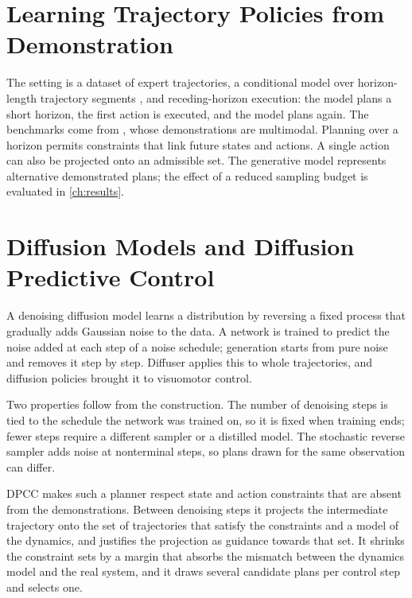 \documentclass[headsepline,footsepline,footinclude=false,oneside,fontsize=11pt,paper=a4,listof=totoc,bibliography=totoc]{scrbook}
\theoremstyle{definition}
\theoremstyle{plain}
\theoremstyle{remark}
\begin{document}
\section{Learning Trajectory Policies from Demonstration}\label{sec:bg:il}

The setting is a dataset of expert trajectories, a conditional model over horizon-length
trajectory segments \parencite{janner2022planning,chi2023diffusion}, and receding-horizon
execution: the model plans a short horizon, the first action is executed, and the model plans again.
The benchmarks come from \parencite{jia2024towards}, whose demonstrations are multimodal. Planning
over a horizon permits constraints that link future states and actions. A single action can also be
projected onto an admissible set. The generative model represents alternative demonstrated plans;
the effect of a reduced sampling budget is evaluated in \autoref{ch:results}.

\section{Diffusion Models and Diffusion Predictive Control}\label{sec:bg:diffusion}

A denoising diffusion model \parencite{sohl2015deep,ho2020denoising} learns a distribution by
reversing a fixed process that gradually adds Gaussian noise to the data. A network is trained to
predict the noise added at each step of a noise schedule; generation starts from pure noise and
removes it step by step. Diffuser \parencite{janner2022planning} applies this to whole trajectories,
and diffusion policies \parencite{chi2023diffusion} brought it to visuomotor control.

Two properties follow from the construction. The number of denoising steps is tied to the schedule
the network was trained on, so it is fixed when training ends; fewer steps require a different sampler
\parencite{song2021denoising} or a distilled model. The stochastic reverse sampler adds noise at nonterminal steps, so plans drawn
for the same observation can differ.

\ac{DPCC} \parencite{romer2025diffusion} makes such a planner respect state and action constraints
that are absent from the demonstrations. Between denoising steps it projects the intermediate
trajectory onto the set of trajectories that satisfy the constraints and a model of the dynamics, and
justifies the projection as guidance towards that set. It shrinks the constraint sets by a margin that
absorbs the mismatch between the dynamics model and the real system, and it draws several candidate
plans per control step and selects one.
\end{document}

